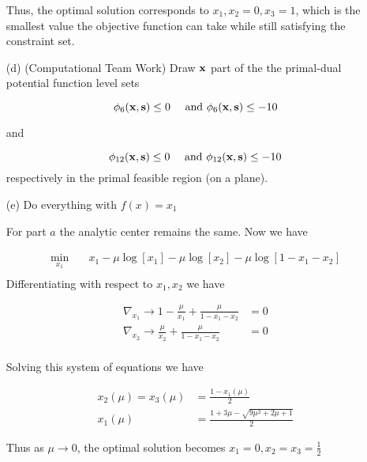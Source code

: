 \documentclass[answers]{exam} %
\newcommand\x{{\bf x}}
\newcommand\s{{\bf s}}
\begin{document}
\begin{itemize}
\begin{framed}
Thus, the optimal solution corresponds to $x_1, x_2 = 0, x_3 = 1$, which is the smallest value the objective function can take while
still satisfying the constraint set. 
\end{framed}


\item[(d)] (Computational Team Work) Draw $\x$ part of the the primal-dual potential function level sets 

\[
\phi_6(\x, \s) \leq 0 \quad \mbox{ and } \phi_6(\x,\s) \leq -10 
\]

and 


\[
\phi_{12}(\x, \s) \leq 0 \quad \mbox{ and } \phi_{12}(\x,\s) \leq -10 
\]
respectively in the primal feasible region (on a plane).


\item[(e)] Do everything with $f(x) = x_1$
\begin{framed}
For part $a$ the analytic center remains the same. Now we have

\begin{equation*}
\begin{aligned}
\min_{x_1} \quad & x_1 - \mu \log[x_1] - \mu \log[x_2] -  \mu \log[1 - x_1 - x_2] \\ 
\end{aligned}
\end{equation*}
Differentiating with respect to $x_1, x_2$ we have 

\begin{equation*}
\begin{aligned}
\nabla_{x_1} \rightarrow 1 - \frac{\mu}{x_1} + \frac{\mu}{1 - x_1 - x_2} &= 0 \\ 
\nabla_{x_2} \rightarrow \frac{\mu}{x_2} + \frac{\mu}{1 - x_1 - x_2} &= 0 \\
\end{aligned}
\end{equation*}


Solving this system of equations we have


\begin{equation*}
\begin{aligned}
x_2(\mu) = x_3(\mu) &= \frac{1 - x_1(\mu)}{2} \\ 
x_1 (\mu) &= \frac{ 1 + 3 \mu - \sqrt{ 9 \mu^2 + 2\mu + 1}}{2}
\end{aligned}
\end{equation*}

Thus as $\mu \to 0$, the optimal solution becomes $x_1 = 0, x_2 = x_3 = \frac{1}{2}$
\end{framed}
\end{itemize}
\end{document}
